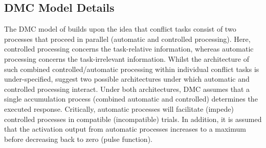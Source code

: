 \subsection{DMC Model Details} 
\label{model_details} 

The DMC model of \textcite{ulrich2015automatic} builds upon the idea that
conflict tasks consist of two processes that proceed in parallel (automatic and
controlled processing). Here, controlled processing concerns the task-relative
information, whereas automatic processing concerns the task-irrelevant
information. Whilst the architecture of such combined controlled/automatic
processing within individual conflict tasks is under-specified,
\textcite{ulrich2015automatic} suggest two possible architectures
\DIFdelbegin %
\DIFdelend \DIFaddbegin \parencite[see Figure 1 in ][]{ulrich2015automatic} \DIFaddend under which automatic and
controlled processing interact. Under both architectures, DMC assumes that a
single accumulation process (combined automatic and controlled) determines the
executed response. Critically, automatic processes will facilitate (impede)
controlled processes in compatible (incompatible) trials. In addition, it is
assumed that the activation output from automatic processes increases to a
maximum before decreasing back to zero (pulse function).

